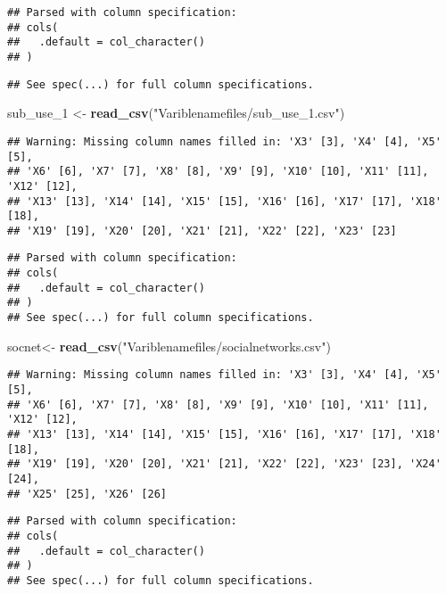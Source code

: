 \documentclass[]{article}
\newenvironment{Shaded}{\begin{snugshade}}{\end{snugshade}}
\newcommand{\KeywordTok}[1]{\textcolor[rgb]{0.13,0.29,0.53}{\textbf{#1}}}
\newcommand{\DecValTok}[1]{\textcolor[rgb]{0.00,0.00,0.81}{#1}}
\newcommand{\StringTok}[1]{\textcolor[rgb]{0.31,0.60,0.02}{#1}}
\newcommand{\NormalTok}[1]{#1}
\begin{document}
\begin{verbatim}
## Parsed with column specification:
## cols(
##   .default = col_character()
## )
\end{verbatim}

\begin{verbatim}
## See spec(...) for full column specifications.
\end{verbatim}

\begin{Shaded}
\begin{Highlighting}[]
\NormalTok{sub_use_}\DecValTok{1}\NormalTok{ <-}\StringTok{ }\KeywordTok{read_csv}\NormalTok{(}\StringTok{"Variblenamefiles/sub_use_1.csv"}\NormalTok{)}
\end{Highlighting}
\end{Shaded}

\begin{verbatim}
## Warning: Missing column names filled in: 'X3' [3], 'X4' [4], 'X5' [5],
## 'X6' [6], 'X7' [7], 'X8' [8], 'X9' [9], 'X10' [10], 'X11' [11], 'X12' [12],
## 'X13' [13], 'X14' [14], 'X15' [15], 'X16' [16], 'X17' [17], 'X18' [18],
## 'X19' [19], 'X20' [20], 'X21' [21], 'X22' [22], 'X23' [23]
\end{verbatim}

\begin{verbatim}
## Parsed with column specification:
## cols(
##   .default = col_character()
## )
## See spec(...) for full column specifications.
\end{verbatim}

\begin{Shaded}
\begin{Highlighting}[]
\NormalTok{socnet<-}\StringTok{ }\KeywordTok{read_csv}\NormalTok{(}\StringTok{"Variblenamefiles/socialnetworks.csv"}\NormalTok{)}
\end{Highlighting}
\end{Shaded}

\begin{verbatim}
## Warning: Missing column names filled in: 'X3' [3], 'X4' [4], 'X5' [5],
## 'X6' [6], 'X7' [7], 'X8' [8], 'X9' [9], 'X10' [10], 'X11' [11], 'X12' [12],
## 'X13' [13], 'X14' [14], 'X15' [15], 'X16' [16], 'X17' [17], 'X18' [18],
## 'X19' [19], 'X20' [20], 'X21' [21], 'X22' [22], 'X23' [23], 'X24' [24],
## 'X25' [25], 'X26' [26]
\end{verbatim}

\begin{verbatim}
## Parsed with column specification:
## cols(
##   .default = col_character()
## )
## See spec(...) for full column specifications.
\end{verbatim}
\end{document}
